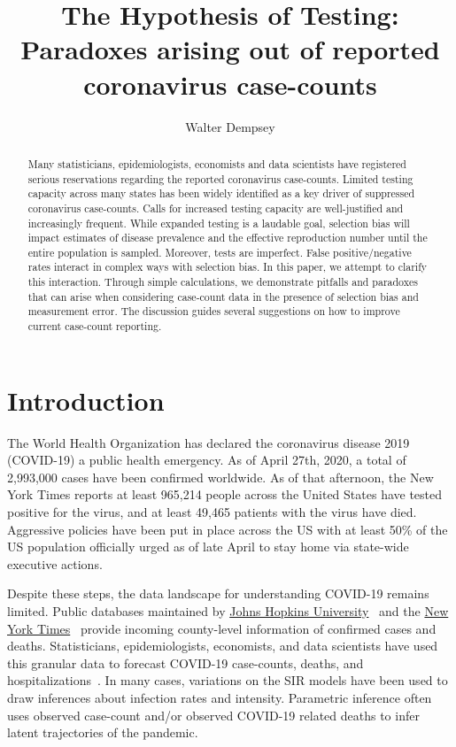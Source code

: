 \documentclass[aoas]{amsart}
\begin{document}
\title[The Hypothesis of Testing]{The Hypothesis of Testing: Paradoxes arising out of reported coronavirus case-counts} %

\author{Walter Dempsey}
\address{Department of Biostatistics, University of Michigan, Ann Arbor, MI 48109}

\begin{abstract}
Many statisticians, epidemiologists, economists and data scientists have registered serious reservations regarding the reported coronavirus case-counts. Limited testing capacity across many states has been widely identified as a key driver of suppressed coronavirus case-counts.  Calls for increased testing capacity are well-justified and increasingly frequent.  While expanded testing is a laudable goal, selection bias will impact estimates of disease prevalence and the effective reproduction number until the entire population is sampled.  Moreover, tests are imperfect.  False positive/negative rates interact in complex ways with selection bias.  In this paper, we attempt to clarify this interaction.  Through simple calculations, we demonstrate pitfalls and paradoxes that can arise when considering case-count data in the presence of selection bias and measurement error. The discussion guides several suggestions on how to improve current case-count reporting.
\end{abstract}

\maketitle

\section{Introduction}
The World Health Organization has declared the coronavirus disease 2019 (COVID-19) a public health emergency.  As of April 27th, 2020, a total of 2,993,000 cases have been confirmed worldwide.  As of that afternoon, the New York Times reports at least 965,214 people across the United States have tested positive for the virus, and at least 49,465 patients with the virus have died.  Aggressive policies have been put in place across the US with at least 50\% of the US population officially urged as of late April to stay home via state-wide executive actions.

Despite these steps, the data landscape for understanding COVID-19 remains limited.  Public databases maintained by \href{https://bit.ly/2UqFSuA}{Johns Hopkins University}~\citep{JHU_Lancet} and the \href{https://bit.ly/2vUHfrK}{New York Times}~\cite{NYT} provide incoming county-level information of confirmed cases and deaths.  Statisticians, epidemiologists, economists, and data scientists have used this granular data to forecast COVID-19 case-counts, deaths, and hospitalizations~\citep{Song2020,Ray2020,2020.IHME}.  In many cases, variations on the SIR models have been used to draw inferences about infection rates and intensity.  Parametric inference often uses observed case-count and/or observed COVID-19 related deaths to infer latent trajectories of the pandemic.
\end{document}

